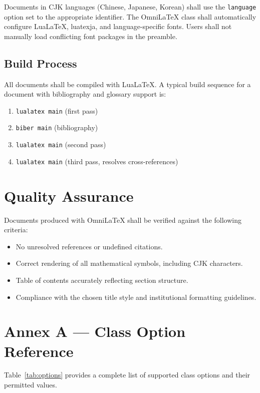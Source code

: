 \documentclass[
    language=english,
    doctype=standard,
    institution=none,
    titlestyle=book,
    oneside,
]{../../omnilatex}
\begin{document}
Documents in CJK languages (Chinese, Japanese, Korean) shall use the \texttt{language} option set to the appropriate identifier. The OmniLaTeX class shall automatically configure LuaLaTeX, luatexja, and language-specific fonts. Users shall not manually load conflicting font packages in the preamble.

\subsection{Build Process}

All documents shall be compiled with LuaLaTeX. A typical build sequence for a document with bibliography and glossary support is:
\begin{enumerate}
    \item \texttt{lualatex main} (first pass)
    \item \texttt{biber main} (bibliography)
    \item \texttt{lualatex main} (second pass)
    \item \texttt{lualatex main} (third pass, resolves cross-references)
\end{enumerate}

\section{Quality Assurance}

Documents produced with OmniLaTeX shall be verified against the following criteria:
\begin{itemize}
    \item No unresolved references or undefined citations.
    \item Correct rendering of all mathematical symbols, including CJK characters.
    \item Table of contents accurately reflecting section structure.
    \item Compliance with the chosen title style and institutional formatting guidelines.
\end{itemize}

\appendix
\section{Annex A --- Class Option Reference}

Table~\ref{tab:options} provides a complete list of supported class options and their permitted values.
\end{document}
